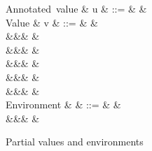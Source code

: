 \begin{figure}
\begin{syntaxfig}
\small
\mbox{Annotated value}
&
u
&
::=
&
&
\\[1mm]
\mbox{Value}
&
v
&
::=
&
\exUnit
&
\\
&&&
&
\\
&&&
&
\\
&&&
&
\\
&&&
\exClosure{\rho}{\exFun{\sigma}}
&
\\
&&&
&
\\[1mm]
\mbox{Environment}
&
\rho
&
::=
&
\envEmpty
&
\\
&&&
&
\end{syntaxfig}
\caption{Partial values and environments}
\label{fig:demand-indexed:syntax-value}
\end{figure}
